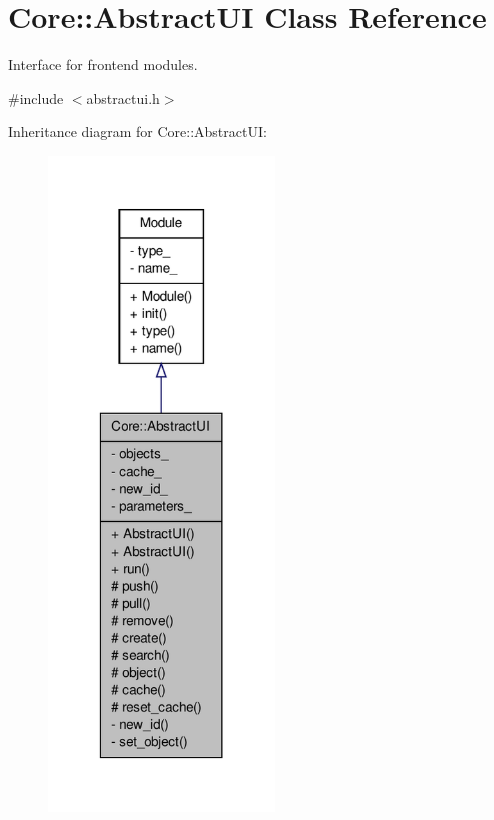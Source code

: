 \hypertarget{classCore_1_1AbstractUI}{
\section{Core::AbstractUI Class Reference}
\label{d1/d45/classCore_1_1AbstractUI}
}


Interface for frontend modules.  




{\ttfamily \#include $<$abstractui.h$>$}



Inheritance diagram for Core::AbstractUI:
\nopagebreak
\begin{figure}[H]
\begin{center}
\leavevmode
\includegraphics[width=170pt]{d4/d85/classCore_1_1AbstractUI__inherit__graph}
\end{center}
\end{figure}


